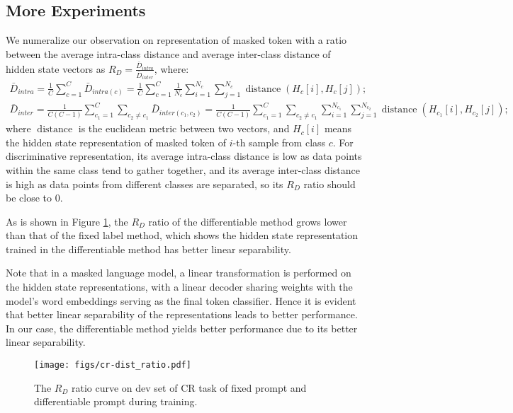 \documentclass{article} \usepackage{iclr2022_conference,times}
\begin{document}
\subsection{More Experiments}
\label{exp_appendx}
We numeralize our observation on representation of masked token with a ratio between the average intra-class distance and average inter-class distance of hidden state vectors as $R_{D}=\frac{\bar{D}_{i n t r a}}{\bar{D}_{i n t e r}}$, where:
\begin{equation}
    \begin{aligned}
\bar{D}_{i n t r a}=\frac{1}{C} \sum_{c=1}^{C} \bar{D}_{i n t r a(c)}=\frac{1}{C} \sum_{c=1}^{C} \frac{1}{N_{c}} \sum_{i=1}^{N_{c}} \sum_{j=1}^{N_{c}} \operatorname{distance}\left(H_{c}[i], H_{c}[j]\right); \\
\bar{D}_{i n t e r}=\frac{1}{C(C-1)} \sum_{c_{1}=1}^{C} \sum_{c_{2} \neq c_{1}} \bar{D}_{i n t e r\left(c_{1}, c_{2}\right)}=\frac{1}{C(C-1)} \sum_{c_{1}=1}^{C} \sum_{c_{2} \neq c_{1}} \sum_{i=1}^{N_{c_{1}}} \sum_{j=1}^{N_{c_{2}}} \operatorname{distance}\left(H_{c_{1}}[i], H_{c_{2}}[j]\right);
    \end{aligned}
\end{equation}
where $\operatorname{distance}$ is the euclidean metric between two vectors, and $H_{c}[i]$ means the hidden state representation of masked token of $i$-th sample from class $c$.
For discriminative representation, its average intra-class distance is low as data points within the same class tend to gather together, and its average inter-class distance is high as data points from different classes are separated, so its $R_D$ ratio should be close to 0.

As is shown in Figure \ref{ratio}, the $R_D$ ratio of the differentiable method grows lower than that of the fixed label method, which shows the hidden state representation trained in the differentiable method has better linear separability.

Note that in a masked language model, a linear transformation is performed on the hidden state representations, with a linear decoder sharing weights with the model's word embeddings serving as the final token classifier. 
Hence it is evident that better linear separability of the representations leads to better performance. 
In our case, the differentiable method yields better performance due to its better linear separability.

\begin{figure}
\centering 
\texttt{[image: figs/cr-dist\_ratio.pdf]}  
\caption{The $R_D$ ratio curve on dev set of CR task of fixed prompt and differentiable prompt during training.}
\label{ratio}  
\end{figure}
\end{document}
